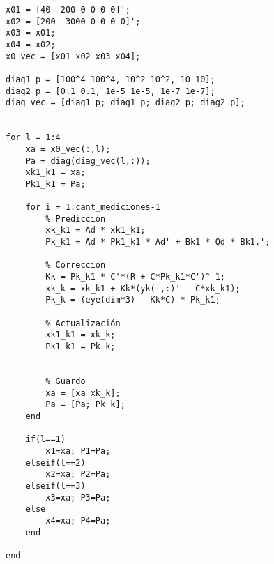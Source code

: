 
	\begin{lstlisting}[caption = Parte del \emph{Script} utilizado para el ejercicio 3]
% Nuevos datos
x01 = [40 -200 0 0 0 0]';
x02 = [200 -3000 0 0 0 0]';
x03 = x01;
x04 = x02;
x0_vec = [x01 x02 x03 x04];

diag1_p = [100^4 100^4, 10^2 10^2, 10 10];
diag2_p = [0.1 0.1, 1e-5 1e-5, 1e-7 1e-7];
diag_vec = [diag1_p; diag1_p; diag2_p; diag2_p];


for l = 1:4
	xa = x0_vec(:,l);
	Pa = diag(diag_vec(l,:));
	xk1_k1 = xa;
	Pk1_k1 = Pa;

	for i = 1:cant_mediciones-1
		% Predicción
		xk_k1 = Ad * xk1_k1;
		Pk_k1 =	Ad * Pk1_k1 * Ad' + Bk1 * Qd * Bk1.';
	
		% Corrección
		Kk = Pk_k1 * C'*(R + C*Pk_k1*C')^-1;
		xk_k = xk_k1 + Kk*(yk(i,:)' - C*xk_k1);
		Pk_k = (eye(dim*3) - Kk*C) * Pk_k1;
		
		% Actualización
		xk1_k1 = xk_k;
		Pk1_k1 = Pk_k;
	
	
		% Guardo
		xa = [xa xk_k];
		Pa = [Pa; Pk_k];
	end

	if(l==1)
		x1=xa; P1=Pa;
	elseif(l==2)
		x2=xa; P2=Pa;
	elseif(l==3)
		x3=xa; P3=Pa;
	else
		x4=xa; P4=Pa;
	end
	
end
	\end{lstlisting}

